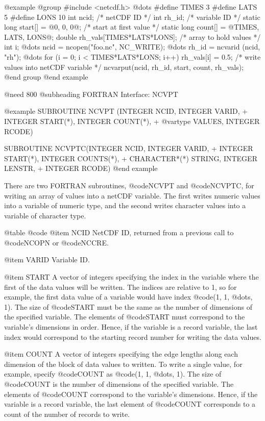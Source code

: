 @example
@group
#include <netcdf.h>
   @dots{}
#define TIMES 3
#define LATS  5
#define LONS  10
int  ncid;                         /* netCDF ID */
int  rh_id;                        /* variable ID */
static long start[] = @{0, 0, 0@};    /* start at first value */
static long count[] = @{TIMES, LATS, LONS@};
double rh_vals[TIMES*LATS*LONS];   /* array to hold values */
int i;
   @dots{}
ncid = ncopen("foo.nc", NC_WRITE);
   @dots{}
rh_id = ncvarid (ncid, "rh");
   @dots{}
for (i = 0; i < TIMES*LATS*LONS; i++)
    rh_vals[i] = 0.5;
/* write values into netCDF variable */
ncvarput(ncid, rh_id, start, count, rh_vals);
@end group
@end example

@need 800
@subheading FORTRAN Interface:  NCVPT

@example
      SUBROUTINE NCVPT (INTEGER NCID, INTEGER VARID,
     +                  INTEGER START(*), INTEGER COUNT(*),
     +                  @var{type} VALUES, INTEGER RCODE)

      SUBROUTINE NCVPTC(INTEGER NCID, INTEGER VARID,
     +                  INTEGER START(*), INTEGER COUNTS(*),
     +                  CHARACTER*(*) STRING, INTEGER LENSTR,
     +                  INTEGER RCODE)
@end example

There are two FORTRAN subroutines, @code{NCVPT} and @code{NCVPTC}, for
writing an array of values into a netCDF variable.  The first writes
numeric values into a variable of numeric type, and the second
writes character values into a variable of character type.

@table @code
@item NCID
NetCDF ID, returned from a previous call to @code{NCOPN} or @code{NCCRE}.

@item VARID
Variable ID.

@item START
A vector of integers specifying the index in the
variable where the first of the data values will be
written.  The indices are relative to 1, so for example, the first data
value of a variable would have index @code{(1, 1, @dots{}, 1)}.  The
size of @code{START} must be the same as the number of dimensions of the
specified variable.  The elements of @code{START} must correspond to the
variable's dimensions in order.  Hence, if the variable is a record
variable, the last index would correspond to the starting record number
for writing the data values.

@item COUNT
A vector of integers specifying the edge lengths along each dimension
of the block of data values to
written.  To write a single value, for example, specify @code{COUNT} as
@code{(1, 1, @dots{}, 1)}.  The size of @code{COUNT} is the number of
dimensions of the specified variable.  The elements of @code{COUNT}
correspond to the variable's dimensions.  Hence, if the variable is a
record variable, the last element of @code{COUNT} corresponds to a
count of the number of records to write.

